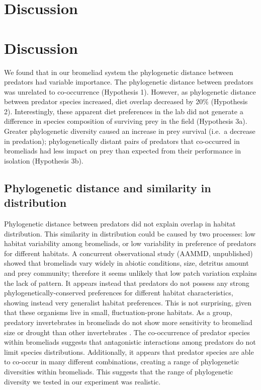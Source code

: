 \documentclass[11pt]{article}
\begin{document}

\section*{Discussion}

\section*{Discussion}

We found that in our bromeliad system the phylogenetic distance between
predators had variable importance. The phylogenetic distance between
predators was unrelated to co-occurrence (Hypothesis 1). However, as
phylogenetic distance between predator species increased, diet overlap
decreased by 20\% (Hypothesis 2). Interestingly, these apparent diet
preferences in the lab did not generate a difference in species
composition of surviving prey in the field (Hypothesis 3a). Greater
phylogenetic diversity caused an increase in prey survival (i.e.~a
decrease in predation); phylogenetically distant pairs of predators that
co-occurred in bromeliads had less impact on prey than expected from
their performance in isolation (Hypothesis 3b).

\subsection*{Phylogenetic distance and similarity in distribution}

Phylogenetic distance between predators did not explain overlap in
habitat distribution. This similarity in distribution could be caused by
two processes: low habitat variability among bromeliads, or low
variability in preference of predators for different habitats. A
concurrent observational study (AAMMD, unpublished) showed that
bromeliads vary widely in abiotic conditions, size, detritus amount and
prey community; therefore it seems unlikely that low patch variation
explains the lack of pattern. It appears instead that predators do not
possess any strong phylogenetically-conserved preferences for different
habitat characteristics, showing instead very generalist habitat
preferences. This is not surprising, given that these organisms live in
small, fluctuation-prone habitats. As a group, predatory invertebrates
in bromeliads do not show more sensitivity to bromeliad size or drought
than other invertebrates \citealt{Amundrud2015}. The co-occurrence of
predator species within bromeliads suggests that antagonistic
interactions among predators do not limit species distributions.
Additionally, it appears that predator species are able to co-occur in
many different combinations, creating a range of phylogenetic
diversities within bromeliads. This suggests that the range of
phylogenetic diversity we tested in our experiment was realistic.
\end{document}
